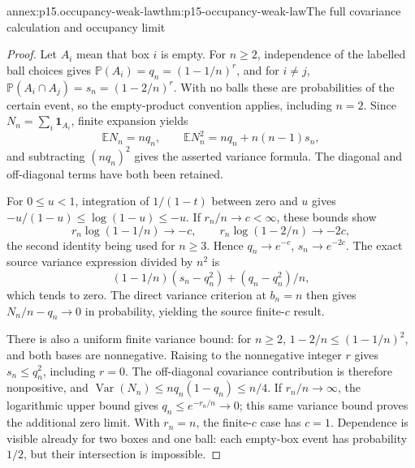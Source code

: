 \begin{annexitem}{annex:p15.occupancy-weak-law}{thm:p15-occupancy-weak-law}{The full covariance calculation and occupancy limit}
\begin{proof}
Let \(A_i\) mean that box \(i\) is empty. For \(n\geq2\),
independence of the labelled ball choices gives
\(\mathbb P(A_i)=q_n=(1-1/n)^r\), and for \(i\ne j\),
\(\mathbb P(A_i\cap A_j)=s_n=(1-2/n)^r\).
With no balls these are probabilities of the certain event,
so the empty-product convention applies, including \(n=2\).
Since \(N_n=\sum_i\mathbf1_{A_i}\), finite expansion yields
\[
 \mathbb EN_n=nq_n,\qquad
 \mathbb EN_n^2=nq_n+n(n-1)s_n,
\]
and subtracting \((nq_n)^2\) gives the asserted variance formula.
The diagonal and off-diagonal terms have both been retained.

For \(0\leq u<1\), integration of \(1/(1-t)\) between zero
and \(u\) gives
\(-u/(1-u)\leq\log(1-u)\leq-u\).
If \(r_n/n\to c<\infty\), these bounds show
\[
 r_n\log(1-1/n)\to-c,\qquad
 r_n\log(1-2/n)\to-2c,
\]
the second identity being used for \(n\geq3\).
Hence \(q_n\to e^{-c}\), \(s_n\to e^{-2c}\).
The exact source variance expression divided by \(n^2\) is
\[
 (1-1/n)(s_n-q_n^2)+(q_n-q_n^2)/n,
\]
which tends to zero. The direct variance criterion at \(b_n=n\)
then gives \(N_n/n-q_n\to0\) in probability, yielding the source
finite-\(c\) result.

There is also a uniform finite variance bound: for \(n\geq2\),
\(1-2/n\leq(1-1/n)^2\), and both bases are nonnegative.
Raising to the nonnegative integer \(r\) gives \(s_n\leq q_n^2\),
including \(r=0\). The off-diagonal covariance contribution is
therefore nonpositive, and
\(\operatorname{Var}(N_n)\leq nq_n(1-q_n)\leq n/4\).
If \(r_n/n\to\infty\), the logarithmic upper bound gives
\(q_n\leq e^{-r_n/n}\to0\); this same variance bound proves
the additional zero limit. With \(r_n=n\), the finite-\(c\)
case has \(c=1\). Dependence is visible already for two boxes
and one ball: each empty-box event has probability \(1/2\),
but their intersection is impossible.
\end{proof}
\end{annexitem}

